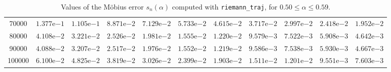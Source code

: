 \begin{table}[ht!]
{\begin{tabular}{|c|c|c|c|c|c|c|c|c|c|c|}
70000  & $1.377\mathrm{e}{-1}$ & $1.105\mathrm{e}{-1}$ & $8.871\mathrm{e}{-2}$ & $7.129\mathrm{e}{-2}$ & $5.733\mathrm{e}{-2}$ & $4.615\mathrm{e}{-2}$ & $3.717\mathrm{e}{-2}$ & $2.997\mathrm{e}{-2}$ & $2.418\mathrm{e}{-2}$ & $1.952\mathrm{e}{-2}$ \\
80000  & $4.108\mathrm{e}{-2}$ & $3.221\mathrm{e}{-2}$ & $2.526\mathrm{e}{-2}$ & $1.981\mathrm{e}{-2}$ & $1.555\mathrm{e}{-2}$ & $1.220\mathrm{e}{-2}$ & $9.579\mathrm{e}{-3}$ & $7.522\mathrm{e}{-3}$ & $5.908\mathrm{e}{-3}$ & $4.642\mathrm{e}{-3}$ \\
90000  & $4.088\mathrm{e}{-2}$ & $3.207\mathrm{e}{-2}$ & $2.517\mathrm{e}{-2}$ & $1.976\mathrm{e}{-2}$ & $1.552\mathrm{e}{-2}$ & $1.219\mathrm{e}{-2}$ & $9.586\mathrm{e}{-3}$ & $7.538\mathrm{e}{-3}$ & $5.930\mathrm{e}{-3}$ & $4.667\mathrm{e}{-3}$ \\
100000 & $6.100\mathrm{e}{-2}$ & $4.825\mathrm{e}{-2}$ & $3.819\mathrm{e}{-2}$ & $3.026\mathrm{e}{-2}$ & $2.399\mathrm{e}{-2}$ & $1.903\mathrm{e}{-2}$ & $1.511\mathrm{e}{-2}$ & $1.201\mathrm{e}{-2}$ & $9.551\mathrm{e}{-3}$ & $7.603\mathrm{e}{-3}$ \\
\hline
\end{tabular}}
\caption{Values of the M\"obius error $s_n(\alpha)$ computed with \texttt{riemann\_traj}, for $0.50 \leq \alpha \leq 0.59$.}
\label{tab:alpha05-f90}
\end{table}

